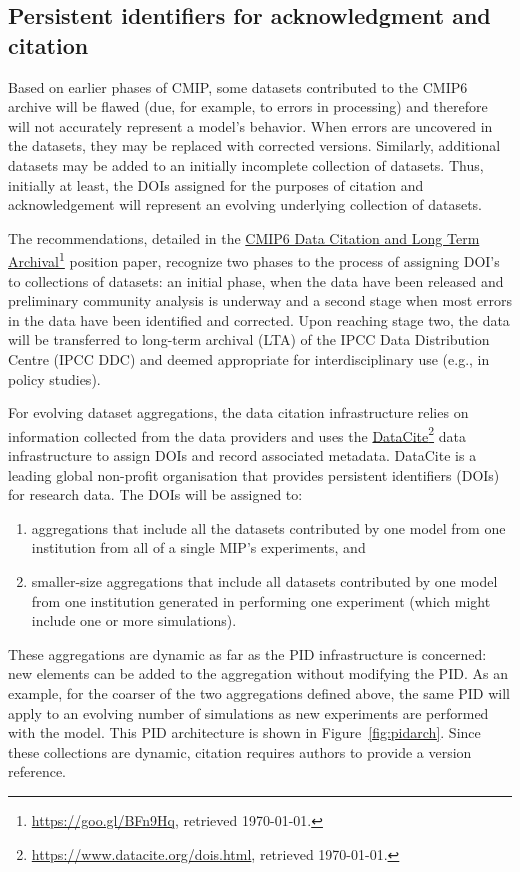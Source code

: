 \documentclass[gmd,manuscript]{copernicus}
\newcommand{\urlref}[2] {\href{#1}{#2}\footnote{\url{#1}, retrieved \today.}}
\begin{document}
\subsection{Persistent identifiers for acknowledgment and citation}
\label{sec:doi}

Based on earlier phases of CMIP, some datasets contributed
to the CMIP6 archive will be flawed (due, for example, to errors in
processing) and therefore will not accurately represent a model's
behavior. When errors are uncovered in the datasets, they may be
replaced with corrected versions. Similarly, additional datasets may
be added to an initially incomplete collection of datasets. Thus,
initially at least, the DOIs assigned for the purposes of citation and
acknowledgement will represent an evolving underlying collection of
datasets.

The recommendations, detailed in the
\urlref{https://goo.gl/BFn9Hq}{CMIP6 Data Citation and Long Term
  Archival} position paper, recognize two phases to the process of
assigning DOI's to collections of datasets: an initial phase, when the
data have been released and preliminary community analysis is 
underway and a second stage when most errors in the data have been
identified and corrected. Upon reaching stage two, the data will be
transferred to long-term archival (LTA) of the IPCC Data Distribution
Centre (IPCC DDC) and deemed appropriate for interdisciplinary use
(e.g., in policy studies). 

For evolving dataset aggregations, the data citation infrastructure
relies on information collected from the data providers and uses the
\urlref{https://www.datacite.org/dois.html}{DataCite} data
infrastructure to assign DOIs and record associated metadata.
DataCite is a leading global non-profit organisation that provides
persistent identifiers (DOIs) for research data. The DOIs will be
assigned to:

\begin{enumerate}
\item aggregations that include all the datasets contributed by one
  model from one institution from all of a single MIP's experiments,
  and
\item smaller-size aggregations that include all datasets contributed by one model
  from one institution generated in performing one experiment (which
  might include one or more simulations).
\end{enumerate}

These aggregations are dynamic as far as the PID infrastructure is
concerned: new elements can be added to the aggregation without
modifying the PID. As an example, for the coarser of the two
aggregations defined above, the same PID will apply to an evolving
number of simulations as new experiments are performed with the model.
This PID architecture is shown in Figure~\ref{fig:pidarch}. Since these
collections are dynamic, citation requires authors to provide a
version reference.
\end{document}
